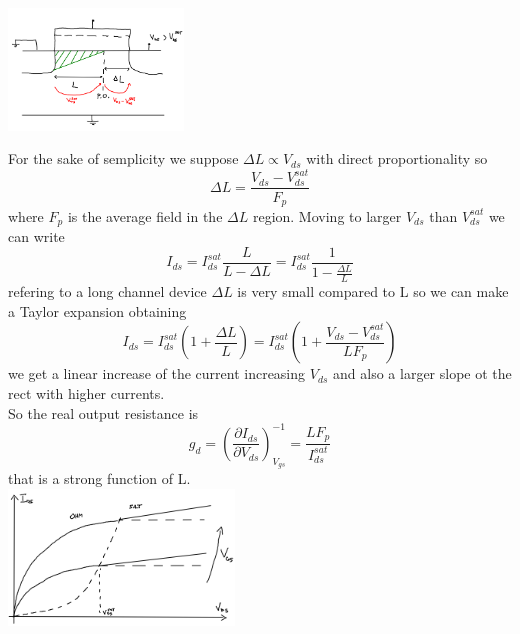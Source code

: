 \centering
\includegraphics[width=0.35\textwidth]{early.png}\\
\raggedright

For the sake of semplicity we suppose $\Delta L\propto V_{ds}$ with direct proportionality so
\begin{equation}
\Delta L =\frac{V_{ds}-V_{ds}^{sat}}{F_p}
\end{equation}
where $F_p$ is the average field in the $\Delta L$ region. Moving to larger $V_{ds}$ than $V_{ds}^{sat}$ we can write 
\begin{equation}
I_{ds}=I_{ds}^{sat}\frac{L}{L-\Delta L }=I_{ds}^{sat}\frac{1}{1-\frac{\Delta L}{L}} 
\end{equation}
refering to a long channel device $\Delta L$ is very small compared to L so we can make a Taylor expansion obtaining 
\begin{equation}
I_{ds}=I_{ds}^{sat}(1+\frac{\Delta L}{L})=I_{ds}^{sat}(1+\frac{V_{ds}-V_{ds}^{sat}}{LF_p})
\end{equation}
we get a linear increase of the current increasing $V_{ds}$ and also a larger slope ot the rect with higher currents.\\
So the real output resistance is 
\begin{equation}
g_d=\left(\frac{\partial I_{ds}}{\partial V_{ds}}\right)^{-1}_{V_{gs}}=\frac{LF_p}{I_{ds}^{sat}}
\end{equation}
that is a strong function of L.\\

\centering
\includegraphics[width=0.45\textwidth]{early1.png}\\
\raggedright

